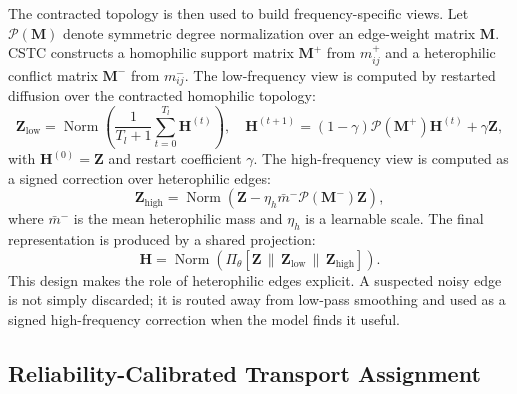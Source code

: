 The contracted topology is then used to build frequency-specific views. Let $\mathcal{P}(\mathbf{M})$ denote symmetric degree normalization over an edge-weight matrix $\mathbf{M}$. CSTC constructs a homophilic support matrix $\mathbf{M}^{+}$ from $m^{+}_{ij}$ and a heterophilic conflict matrix $\mathbf{M}^{-}$ from $m^{-}_{ij}$. The low-frequency view is computed by restarted diffusion over the contracted homophilic topology:
\begin{equation}
  \mathbf{Z}_{\mathrm{low}}
  =
  \operatorname{Norm}\left(
  \frac{1}{T_l+1}
  \sum_{t=0}^{T_l}
  \mathbf{H}^{(t)}
  \right),
  \quad
  \mathbf{H}^{(t+1)}
  =
  (1-\gamma)\mathcal{P}(\mathbf{M}^{+})\mathbf{H}^{(t)}
  +\gamma\mathbf{Z},
\end{equation}
with $\mathbf{H}^{(0)}=\mathbf{Z}$ and restart coefficient $\gamma$. The high-frequency view is computed as a signed correction over heterophilic edges:
\begin{equation}
  \mathbf{Z}_{\mathrm{high}}
  =
  \operatorname{Norm}
  \left(
  \mathbf{Z}
  -
  \eta_h \bar{m}^{-}\mathcal{P}(\mathbf{M}^{-})\mathbf{Z}
  \right),
\end{equation}
where $\bar{m}^{-}$ is the mean heterophilic mass and $\eta_h$ is a learnable scale. The final representation is produced by a shared projection:
\begin{equation}
  \mathbf{H}
  =
  \operatorname{Norm}
  \left(
  \Pi_{\theta}\left[
  \mathbf{Z}\,\|\,\mathbf{Z}_{\mathrm{low}}\,\|\,\mathbf{Z}_{\mathrm{high}}
  \right]
  \right).
\end{equation}
This design makes the role of heterophilic edges explicit. A suspected noisy edge is not simply discarded; it is routed away from low-pass smoothing and used as a signed high-frequency correction when the model finds it useful.

\subsection{Reliability-Calibrated Transport Assignment}
\label{subsec:transport}

